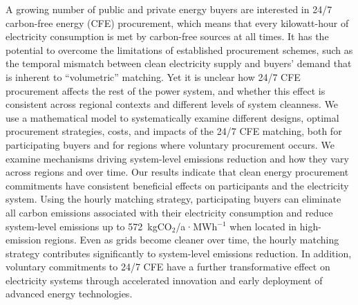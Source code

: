 %


A growing number of public and private energy buyers are interested in 24/7 carbon-free energy (CFE) procurement, which means that every kilowatt-hour of electricity consumption is met by carbon-free sources at all times.
It has the potential to overcome the limitations of established procurement schemes, such as the temporal mismatch between clean electricity supply and buyers' demand that is inherent to \enquote{volumetric} matching.
Yet it is unclear how 24/7 CFE procurement affects the rest of the power system, and whether this effect is consistent across regional contexts and different levels of system cleanness.
We use a mathematical model to systematically examine different designs, optimal procurement strategies, costs, and impacts of the 24/7 CFE matching, both for participating buyers and for regions where voluntary procurement occurs.
We examine mechanisms driving system-level emissions reduction and how they vary across regions and over time.
Our results indicate that clean energy procurement commitments have consistent beneficial effects on participants and the electricity system.
Using the hourly matching strategy, participating buyers can eliminate all carbon emissions associated with their electricity consumption and reduce system-level emissions up to 572~kgCO$_2$/a·MWh$^{-1}$ when located in high-emission regions.
Even as grids become cleaner over time, the hourly matching strategy contributes significantly to system-level emissions reduction.
In addition, voluntary commitments to 24/7 CFE have a further transformative effect on electricity systems through accelerated innovation and early deployment of advanced energy technologies.


